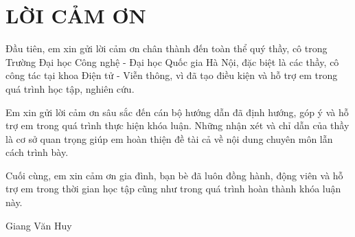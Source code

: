 \chapter*{LỜI CẢM ƠN}
\fontsize{13}{15}\selectfont

Đầu tiên, em xin gửi lời cảm ơn chân thành đến toàn thể quý thầy, cô trong Trường Đại học Công nghệ - Đại học Quốc gia Hà Nội, đặc biệt là các thầy, cô công tác tại khoa Điện tử - Viễn thông, vì đã tạo điều kiện và hỗ trợ em trong quá trình học tập, nghiên cứu.

Em xin gửi lời cảm ơn sâu sắc đến cán bộ hướng dẫn đã định hướng, góp ý và hỗ trợ em trong quá trình thực hiện khóa luận. Những nhận xét và chỉ dẫn của thầy là cơ sở quan trọng giúp em hoàn thiện đề tài cả về nội dung chuyên môn lẫn cách trình bày.

Cuối cùng, em xin cảm ơn gia đình, bạn bè đã luôn đồng hành, động viên và hỗ trợ em trong thời gian học tập cũng như trong quá trình hoàn thành khóa luận này.

\vspace{2cm}
\begin{flushright}
    Giang Văn Huy\hspace*{1.3cm}
\end{flushright}

